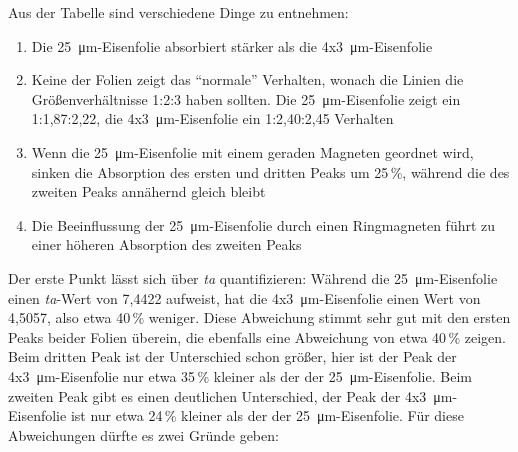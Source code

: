 \documentclass[german, %
parskip=full, %
bibliography=totoc, %
]{scrartcl}
\begin{document}
Aus der Tabelle sind verschiedene Dinge zu entnehmen:
\begin{enumerate}
\item Die \SI{25}{\micro\meter}-Eisenfolie absorbiert stärker als die 4x\SI{3}{\micro\meter}-Eisenfolie
\item Keine der Folien zeigt das "`normale"' Verhalten, wonach die Linien die Größenverhältnisse 1:2:3 haben sollten. Die \SI{25}{\micro\meter}-Eisenfolie zeigt ein 1:1,87:2,22, die 4x\SI{3}{\micro\meter}-Eisenfolie ein 1:2,40:2,45 Verhalten
\item Wenn die \SI{25}{\micro\meter}-Eisenfolie mit einem geraden Magneten geordnet wird, sinken die Absorption des ersten und dritten Peaks um 25\,\%, während die des zweiten Peaks annähernd gleich bleibt
\item Die Beeinflussung der \SI{25}{\micro\meter}-Eisenfolie durch einen Ringmagneten führt zu einer höheren Absorption des zweiten Peaks
\end{enumerate}
Der erste Punkt lässt sich über \textit{ta} quantifizieren: Während die \SI{25}{\micro\meter}-Eisenfolie einen \textit{ta}-Wert von 7,4422 aufweist, hat die 4x\SI{3}{\micro\meter}-Eisenfolie einen Wert von 4,5057, also etwa 40\,\% weniger. Diese Abweichung stimmt sehr gut mit den ersten Peaks beider Folien überein, die ebenfalls eine Abweichung von etwa 40\,\% zeigen. Beim dritten Peak ist der Unterschied schon größer, hier ist der Peak der 4x\SI{3}{\micro\meter}-Eisenfolie nur etwa 35\,\% kleiner als der der \SI{25}{\micro\meter}-Eisenfolie. Beim zweiten Peak gibt es einen deutlichen Unterschied, der Peak der 4x\SI{3}{\micro\meter}-Eisenfolie ist nur etwa 24\,\% kleiner als der der \SI{25}{\micro\meter}-Eisenfolie. Für diese Abweichungen dürfte es zwei Gründe geben:
\end{document}
